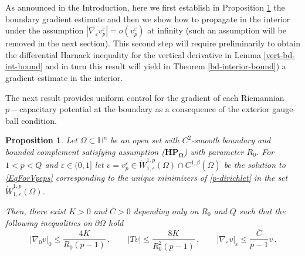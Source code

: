 \documentclass[10pt]{amsart}
\numberwithin{equation}{section}
\newtheorem{proposition}[theorem]{Proposition}
\theoremstyle{definition}
\newcommand{\eps}{\varepsilon}
\newcommand{\He}{\mathbb{H}}
\newcommand{\egrad}{\nabla_{\eps}}
\begin{document}
 As announced in the Introduction, here we first establish in  Proposition \ref{p-harm-bd-bound} the boundary gradient estimate and then we show how  to propagate in the interior under the assumption $|\egrad v^\varepsilon_p|=o(v^\varepsilon_p)$ at infinity (such an assumption will be removed in the next section). This second step will require preliminarily to obtain the differential Harnack inequality for the vertical derivative in Lemma \ref{vert-bd-int-bound} and in turn this result will yield in Theorem \ref{bd-interior-bound}) a gradient estimate in the interior.  

The next result provides uniform control for the gradient of each Riemannian $p-$capacitary potential at the boundary as a consequence of the exterior gauge-ball condition. 

\begin{proposition}
\label{p-harm-bd-bound}
Let $\Omega \subset \He^n$ be an open set with $C^2$-smooth boundary and bounded complement satisfying assumption ($\mathbf{HP_\Omega}$) with parameter $R_0$. For $1<p <Q$ and $\varepsilon \in(0,1]$ let $v=v^\varepsilon_p \in   \dot{W}^{1,p}_{1,\varepsilon}(\Omega) \cap C^{1,\beta}(\overline{\Omega})$ be the solution to \eqref{EqForVpeps} corresponding to the unique minimizers of \eqref{p-dirichlet}  
in the set $\dot{W}^{1,p}_{1, \varepsilon} (\Omega)$.

Then, there exist $K>0$ and $\overline{C}>0$ depending only on $R_0$ and $Q$ such that the following inequalities on $\partial \Omega$ hold
\begin{equation}
\label{bd-grad-bound}
 |\nabla_0  v|_0  \leq \frac{4 K}{R_0(p-1)} \, , \qquad  | T v  | \leq \frac{8 K }{R_0^2(p-1)} \, , \qquad 
 |\nabla_\varepsilon  v|_\varepsilon \leq \frac{\overline{C}}{p-1} v \, .
\end{equation}

\end{proposition}


\end{document}
